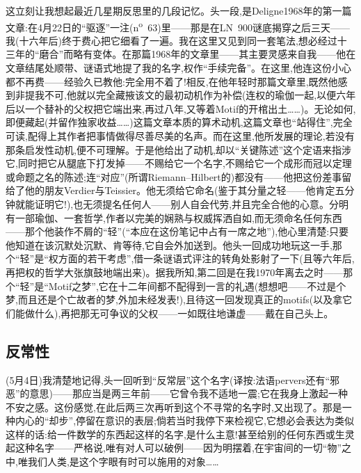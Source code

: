 这立刻让我想起最近几星期反思里的几段记忆。头一段,是Deligne1968年的第一篇文章:在4月22日的“驱逐”一注(n\textsuperscript{o}~63)里——那是在LN~900谜底揭穿之后三天——我(十六年后)终于费心把它细看了一遍。我在这里又见到同一套笔法,想必经过十三年的“磨合”而略有变体。在那篇1968年的文章里——其主要灵感来自我——他在文章结尾处顺带、谜语式地提了我的名字,权作“手续完备”。在这里,他连这份小心都不再费——经验久已教他:完全用不着了!相反,在他年轻时那篇文章里,既然他感到非提我不可,他就以完全藏掖该文的最初动机作为补偿(连权的瑜伽一起,以便六年后以一个替补的父权把它端出来,再过八年,又等着Motif的开棺出土……)。无论如何,即便藏起(并留作独家收益……)这篇文章本质的算术动机,这篇文章也“站得住”,完全可读,配得上其作者把事情做得尽善尽美\dmark{}的名声。而在这里,他所发展的理论,若没有那条启发性动机,便不可理解。于是他给出了动机,却以“关键陈述”这个定语来指涉它,同时把它从腿底下打发掉——不赐给它一个名字,不赐给它一个成形而冠以定理或命题之名的陈述;连“对应”(所谓Riemann--Hilbert的)都没有——他把这份差事留给了他的朋友Verdier与Teissier。他无须给它命名(鉴于其分量之轻——他肯定五分钟就能证明它!),也无须提名任何人——别人自会代劳,并且完全合他的心意。分明有一部瑜伽、一套哲学,作者以完美的娴熟与权威挥洒自如,而无须命名任何东西——那个他装作不屑的“轻”(“本应在这份笔记中占有一席之地”),他心里清楚:只要他知道在该沉默处沉默、肯等待,它自会外加送到。他头一回成功地玩这一手,那个“轻”是“权方面的若干考虑”,借一条谜语式评注的转角处影射了一下(且等六年后,再把权的哲学大张旗鼓地端出来)。据我所知,第二回是在我1970年离去之时——那个“轻”是“Motif之梦”,它在十二年间都不配得到一言的礼遇(想想吧——不过是个梦,而且还是个亡故者的梦,外加未经发表!),且待这一回发现真正的motifs(以及拿它们能做什么),再把那无可争议的父权——一如既往地谦虚——戴在自己头上。

\subsection{反常性}


(5月4日)我清楚地记得,头一回听到“反常层”这个名字(译按:法语pervers还有“邪恶”的意思)——那应当是两三年前——它曾令我不适地一震;它在我身上激起一种不安之感。这份感觉,在此后两三次再听到这个不寻常的名字时,又出现了。那是一种内心的“却步”,停留在意识的表层;倘若当时我停下来检视它,它想必会表达为类似这样的话:给一件数学的东西起这样的名字,是什么主意!甚至给\dmark{}别的任何东西或生灵起这种名字——严格说,唯有对人可以破例——因为明摆着,在宇宙间的一切“物”之中,唯我们人类,是这个字眼有时可以施用的对象……

